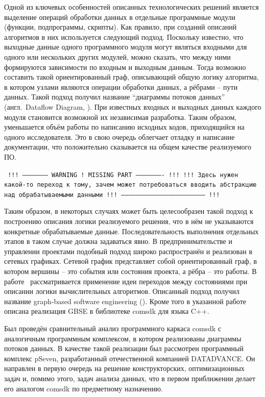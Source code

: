 Одной из ключевых особенностей описанных технологических решений является выделение операций обработки данных в отдельные программные модули (функции, подпрограммы, скрипты). Как правило, при созданий описаний алгоритмов в них используется следующий подход. Поскольку известно, что выходные данные одного программного модуля могут являться входными для одного или нескольких других модулей, можно сказать, что между ними формируются зависимости по входным и выходным данным. Тогда возможно составить такой ориентированный граф, описывающий общую логику алгоритма, в котором узлами являются операции обработки данных, а рёбрами -- пути данных. Такой подход получил название ``диаграммы потоков данных'' (англ.~Dataflow Diagram, ). При известных входных и выходных данных каждого модуля становится возможной их независимая разработка\cite{DanilovPar2011}. Таким образом, уменьшается объём работы по написанию исходных кодов, приходящийся на одного исследователя. Это в свою очередь облегчает отладку и написание документации, что положительно сказывается на общем качестве реализуемого ПО.


\texttt{
  !!! --------------------- WARNING ! MISSING PART ---------------------- !!! \newline
  !!! Здесь нужен какой-то переход к тому, зачем может потребоваться вводить абстракцию над обрабатываемыми данными \newline
  !!! -------------------------------------------------------------------- !!! \newline
}

Таким образом, в некоторых случаях может быть целесообразен такой подход к построению описания логики реализуемого решения, что в нём не указываются конкретные обрабатываемые данные. Последовательность выполнения отдельных этапов в таком случае должна задаваться явно. В предпринимательстве и управлении проектами подобный подход широко распространён и реализован в сетевых графиках. Сетевой график представляет собой ориентированный граф, в котором вершины -- это события или состояния проекта, а рёбра -- это работы. В работе~\cite{SokolovPershin2018} рассматривается применение идеи переходов между состояниями при описании логики вычислительных алгоритмов. Описанный подход получил название graph-based software engineering (). Кроме того в указанной работе описана реализация GBSE в библиотеке comsdk для языка C++.

Был проведён сравнительный анализ программного каркаса comsdk с аналогичным программным комплексом, в котором реализованы диаграммы потоков данных. В качестве такой реализации был рассмотрен программный комплекс pSeven, разработанный отечественной компанией DATADVANCE. Он направлен в первую очередь на решение конструкторских, оптимизационных задач и, помимо этого, задач анализа данных, что в первом приближении делает его аналогом comsdk по предметному назначению.

